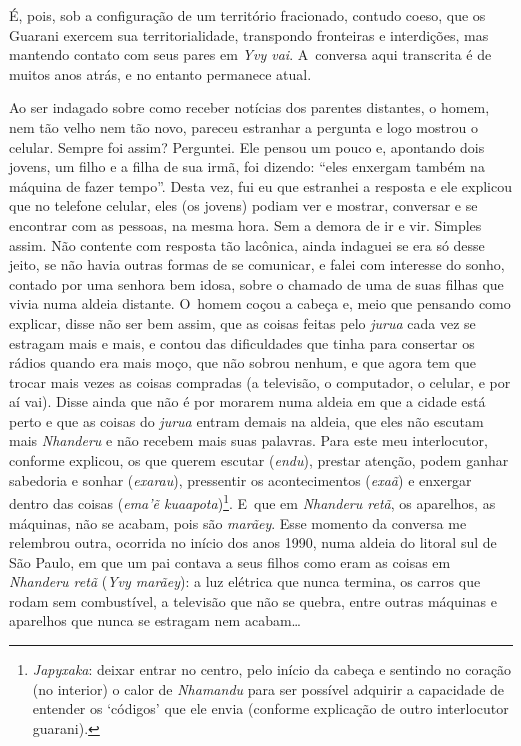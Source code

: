 É, pois, sob a configuração de um território fracionado, contudo coeso,
que os Guarani exercem sua territorialidade, transpondo fronteiras e
interdições, mas mantendo contato com seus pares em \emph{Yvy vai}. A~conversa
aqui transcrita é de muitos anos atrás, e no entanto permanece atual. 

Ao ser indagado sobre como receber notícias dos parentes distantes, o
homem, nem tão velho nem tão novo, pareceu estranhar a pergunta e logo
mostrou o celular. Sempre foi assim? Perguntei. Ele pensou um pouco e,
apontando dois jovens, um filho e a filha de sua irmã, foi dizendo:
``eles enxergam também na máquina de fazer tempo''. Desta vez, fui eu que
estranhei a resposta e ele explicou que no telefone celular, eles (os
jovens) podiam ver e mostrar, conversar e se encontrar com as pessoas,
na mesma hora. Sem a demora de ir e vir. Simples assim. Não contente
com resposta tão lacônica, ainda indaguei se era só desse jeito, se não
havia outras formas de se comunicar, e falei com interesse do sonho,
contado por uma senhora bem idosa, sobre o chamado de uma de suas
filhas que vivia numa aldeia distante. O~homem coçou a cabeça e, meio
que pensando como explicar, disse não ser bem assim, que as coisas
feitas pelo \emph{jurua} cada vez se estragam mais e mais, e contou das
dificuldades que tinha para consertar os rádios quando era mais moço,
que não sobrou nenhum, e que agora tem que trocar mais vezes as coisas
compradas (a televisão, o computador, o celular, e por aí vai). Disse
ainda que não é por morarem numa aldeia em que a cidade está perto e
que as coisas do \emph{jurua} entram demais na aldeia, que eles não escutam
mais \emph{Nhanderu} e não recebem mais suas palavras. Para este meu
interlocutor, conforme explicou, os que querem escutar (\emph{endu}), prestar
atenção, podem ganhar sabedoria e sonhar (\emph{exarau}), pressentir os
acontecimentos (\emph{exaã}) e enxergar dentro das coisas (\emph{ema'ẽ
kuaapota})\footnote{\emph{Japyxaka}: deixar entrar no centro, pelo início da
cabeça e sentindo no coração (no interior) o calor de \emph{Nhamandu} para ser
possível adquirir a capacidade de entender os ‘códigos’ que ele envia
(conforme explicação de outro interlocutor guarani).}. E~que em
\emph{Nhanderu retã}, os aparelhos, as máquinas, não se acabam, pois são
\emph{marãey}. Esse momento da conversa me relembrou outra, ocorrida no início
dos anos 1990, numa aldeia do litoral sul de São Paulo, em que um pai
contava a seus filhos como eram as coisas em \emph{Nhanderu retã} (\emph{Yvy
marãey}): a luz elétrica que nunca termina, os carros que rodam sem
combustível, a televisão que não se quebra, entre outras máquinas e
aparelhos que nunca se estragam nem acabam\ldots{} 

